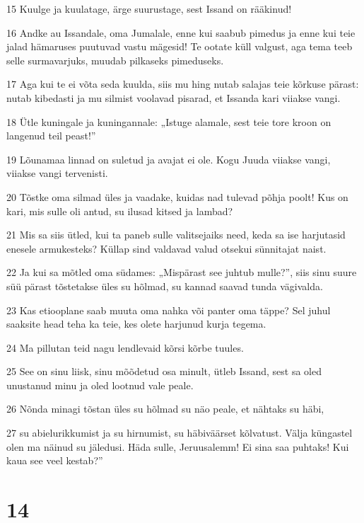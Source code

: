 \par 15 Kuulge ja kuulatage, ärge suurustage, sest Issand on rääkinud!
\par 16 Andke au Issandale, oma Jumalale, enne kui saabub pimedus ja enne kui teie jalad hämaruses puutuvad vastu mägesid! Te ootate küll valgust, aga tema teeb selle surmavarjuks, muudab pilkaseks pimeduseks.
\par 17 Aga kui te ei võta seda kuulda, siis mu hing nutab salajas teie kõrkuse pärast: nutab kibedasti ja mu silmist voolavad pisarad, et Issanda kari viiakse vangi.
\par 18 Ütle kuningale ja kuningannale: „Istuge alamale, sest teie tore kroon on langenud teil peast!”
\par 19 Lõunamaa linnad on suletud ja avajat ei ole. Kogu Juuda viiakse vangi, viiakse vangi tervenisti.
\par 20 Tõstke oma silmad üles ja vaadake, kuidas nad tulevad põhja poolt! Kus on kari, mis sulle oli antud, su ilusad kitsed ja lambad?
\par 21 Mis sa siis ütled, kui ta paneb sulle valitsejaiks need, keda sa ise harjutasid enesele armukesteks? Küllap sind valdavad valud otsekui sünnitajat naist.
\par 22 Ja kui sa mõtled oma südames: „Mispärast see juhtub mulle?”, siis sinu suure süü pärast tõstetakse üles su hõlmad, su kannad saavad tunda vägivalda.
\par 23 Kas etiooplane saab muuta oma nahka või panter oma täppe? Sel juhul saaksite head teha ka teie, kes olete harjunud kurja tegema.
\par 24 Ma pillutan teid nagu lendlevaid kõrsi kõrbe tuules.
\par 25 See on sinu liisk, sinu mõõdetud osa minult, ütleb Issand, sest sa oled unustanud minu ja oled lootnud vale peale.
\par 26 Nõnda minagi tõstan üles su hõlmad su näo peale, et nähtaks su häbi,
\par 27 su abielurikkumist ja su hirnumist, su häbiväärset kõlvatust. Välja küngastel olen ma näinud su jäledusi. Häda sulle, Jeruusalemm! Ei sina saa puhtaks! Kui kaua see veel kestab?”

\chapter{14}

